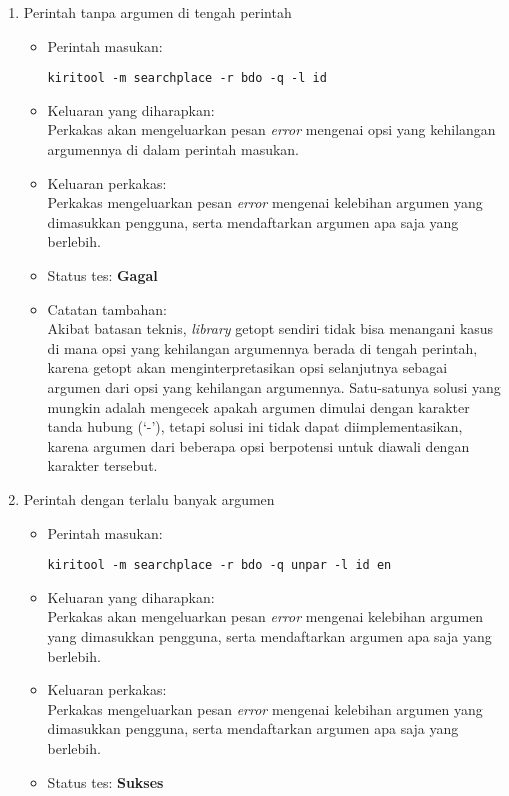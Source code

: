 \begin{enumerate}
	\item Perintah tanpa argumen di tengah perintah
	\begin{itemize}
		\item Perintah masukan:
		\begin{verbatim}
kiritool -m searchplace -r bdo -q -l id
		\end{verbatim}
		\item Keluaran yang diharapkan: \\
		Perkakas akan mengeluarkan pesan \textit{error} mengenai opsi yang kehilangan argumennya di dalam perintah masukan.
		\item Keluaran perkakas: \\
		Perkakas mengeluarkan pesan \textit{error} mengenai kelebihan argumen yang dimasukkan pengguna, serta mendaftarkan argumen apa saja yang berlebih.
		\item Status tes: \textbf{Gagal}
		\item Catatan tambahan: \\
		Akibat batasan teknis, \textit{library} getopt sendiri tidak bisa menangani kasus di mana opsi yang kehilangan argumennya berada di tengah perintah, karena getopt akan menginterpretasikan opsi selanjutnya sebagai argumen dari opsi yang kehilangan argumennya. Satu-satunya solusi yang mungkin adalah mengecek apakah argumen dimulai dengan karakter tanda hubung (`-'), tetapi solusi ini tidak dapat diimplementasikan, karena argumen dari beberapa opsi berpotensi untuk diawali dengan karakter tersebut.
	\end{itemize}
	
	\item Perintah dengan terlalu banyak argumen
	\begin{itemize}
		\item Perintah masukan:
		\begin{verbatim}
kiritool -m searchplace -r bdo -q unpar -l id en
		\end{verbatim}
		\item Keluaran yang diharapkan: \\
		Perkakas akan mengeluarkan pesan \textit{error} mengenai kelebihan argumen yang dimasukkan pengguna, serta mendaftarkan argumen apa saja yang berlebih.
		\item Keluaran perkakas: \\
		Perkakas mengeluarkan pesan \textit{error} mengenai kelebihan argumen yang dimasukkan pengguna, serta mendaftarkan argumen apa saja yang berlebih.
		\item Status tes: \textbf{Sukses}
	\end{itemize}
	

\end{enumerate}
